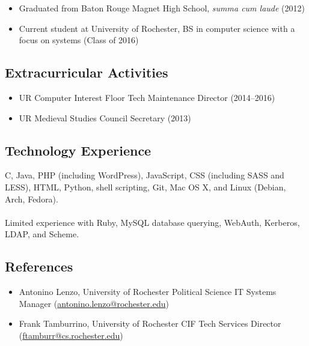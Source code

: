 \documentclass[10pt]{article}
\begin{document}
\begin{itemize}
	\item Graduated from Baton Rouge Magnet High School, \textit{summa cum laude} (2012)
	\item Current student at University of Rochester, BS in computer science with a focus on systems (Class of 2016)
\end{itemize}



\subsection*{Extracurricular Activities}

\begin{itemize}
	\item UR Computer Interest Floor Tech Maintenance Director (2014--2016)
	\item UR Medieval Studies Council Secretary (2013)
\end{itemize}



\subsection*{Technology Experience}

C, Java, PHP (including WordPress), JavaScript, CSS (including SASS and LESS), HTML, Python, shell scripting, Git, Mac OS X, and Linux (Debian, Arch, Fedora).\\
\leavevmode\\
Limited experience with Ruby, MySQL database querying, WebAuth, Kerberos, LDAP, and Scheme.



\subsection*{References}

\begin{itemize}
	\item Antonino Lenzo, University of Rochester Political Science IT Systems Manager (\href{mailto:antonino.lenzo@rochester.edu}{antonino.lenzo@rochester.edu})
	\item Frank Tamburrino, University of Rochester CIF Tech Services Director (\href{mailto:ftamburr@cs.rochester.edu}{ftamburr@cs.rochester.edu})
\end{itemize}
\end{document}
